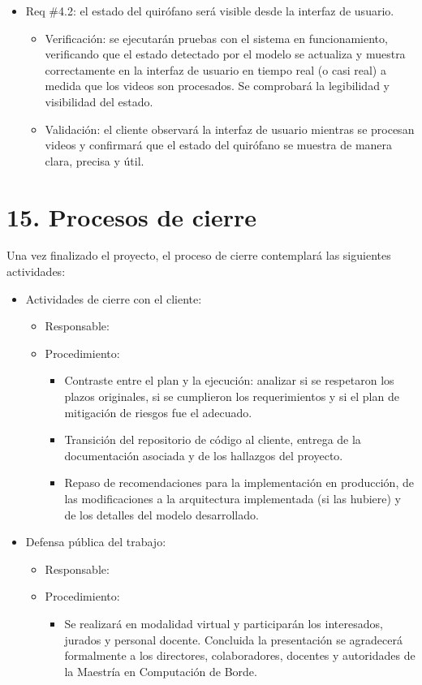 \documentclass[
11pt, %
]{charter}
\begin{document}
\begin{itemize}
	\item Req \#4.2: el estado del quirófano será visible desde la interfaz de usuario.
	\begin{itemize}
		\item Verificación: se ejecutarán pruebas con el sistema en funcionamiento, verificando que el estado detectado por el modelo se actualiza y muestra correctamente en la interfaz de usuario en tiempo real (o casi real) a medida que los videos son procesados. Se comprobará la legibilidad y visibilidad del estado.
		\item Validación: el cliente observará la interfaz de usuario mientras se procesan videos y confirmará que el estado del quirófano se muestra de manera clara, precisa y útil. %
	\end{itemize}
	
\end{itemize}


\section{15. Procesos de cierre}    
\label{sec:cierre}

Una vez finalizado el proyecto, el proceso de cierre contemplará las siguientes actividades:
\begin{itemize}
	\item Actividades de cierre con el cliente:
	\begin{itemize}
		\item[] Responsable: \authorname
		\item[] Procedimiento:
		\begin{itemize}
			\item Contraste entre el plan y la ejecución: analizar si se respetaron los plazos originales, si se cumplieron los requerimientos y si el plan de mitigación de riesgos fue el adecuado.
			\item Transición del repositorio de código al cliente, entrega de la documentación asociada y de los hallazgos del proyecto.
			\item Repaso de recomendaciones para la implementación en producción, de las modificaciones a la arquitectura implementada (si las hubiere) y de los detalles del modelo desarrollado.
		\end{itemize}
	\end{itemize}
		\item Defensa pública del trabajo:
	\begin{itemize}
		\item[] Responsable: \authorname
		\item[] Procedimiento:
		\begin{itemize}
			\item Se realizará en modalidad virtual y participarán los interesados, jurados y personal docente. Concluida la presentación se agradecerá formalmente a los directores, colaboradores, docentes y autoridades de la Maestría en Computación de Borde.

		\end{itemize}
		\end{itemize}
\end{itemize}
\end{document}
